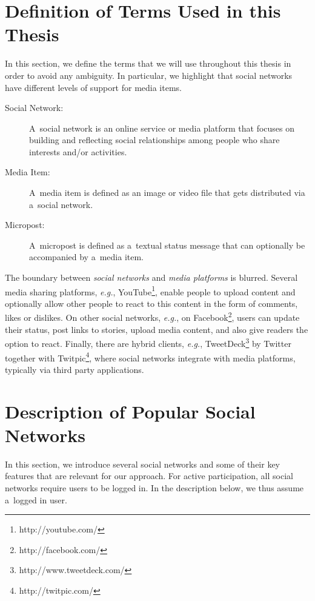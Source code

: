 \section{Definition of Terms Used in this Thesis}
\label{sec:definition}

In this section, we define the terms
that we will use throughout this thesis
in order to avoid any ambiguity.
In particular, we highlight that social networks have
different levels of support for media items.

\begin{description}
  \item[Social Network:]
       A~social network is an online service or media platform
       that focuses on building and reflecting
       social relationships among people
       who share interests and/or activities.
  \item[Media Item:]
       A~media item is defined as an image or video
       file that gets distributed via a~social network.
  \item[Micropost:]
       A~micropost is defined as a~textual status message
       that can optionally be accompanied by a~media item.
\end{description}

The boundary between \emph{social networks} and
\emph{media platforms} is blurred.
Several media sharing platforms, \emph{e.g.},
YouTube\footnote{http://youtube.com/},
enable people to upload content
and optionally allow other people to react
to this content in the form of comments, likes or dislikes.
On other social networks, \emph{e.g.},
on Facebook\footnote{http://facebook.com/},
users can update their status, post links to stories,
upload media content, and also give readers the option to react.
Finally, there are hybrid clients, \emph{e.g.},
TweetDeck\footnote{http://www.tweetdeck.com/}
by Twitter together with
Twitpic\footnote{http://twitpic.com/},
where social networks integrate with media platforms,
typically via third party applications.

\section{Description of Popular Social Networks}

In this section, we introduce several social networks
and some of their key features
that are relevant for our approach.
For active participation,
all social networks require users to be logged in.
In the description below, we thus assume a~logged in user.

